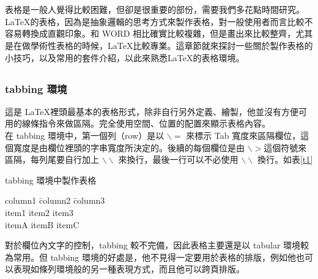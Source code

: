 

%
\chapter{}
表格是一般人覺得比較困難，但卻是很重要的部份，需要我們多花點時間研究。\LaTeX 的表格，因為是抽象邏輯的思考方式來製作表格，對一般使用者而言比較不容易轉換成直觀印象。和 WORD 相比確實比較複雜，但是畫出來比較整齊，尤其是在做學術性表格的時候，\LaTeX 比較專業。這章節就來探討一些關於製作表格的小技巧，以及常用的套件介紹，以此來熟悉\LaTeX 的表格環境。
\\
\section{}

\subsection{tabbing 環境}
這是 \LaTeX 裡頭最基本的表格形式，除非自行另外定義、繪製，他並沒有方便可用的線條指令來做區隔。完全使用空間、位置的配置來顯示表格內容。\\
在 tabbing 環境中，第一個列（row）是以 $\backslash =$ 來標示 Tab 寬度來區隔欄位，這個寬度是由欄位裡頭的字串寬度所決定的。後續的每個欄位是由 $\backslash > $這個符號來區隔，每列尾要自行加上 $\backslash \backslash$ 來換行，最後一行可以不必使用 $\backslash \backslash$ 換行。如表\ref{t1}\\

\begin{table}[h]
    \caption{tabbing 環境中製作表格}\label{t1}
    \smallskip
\begin{tabbing}
column1 \= column2 \= column3 \\
item1   \> item2   \> item3   \\
itemA   \> itemB   \> itemC
\end{tabbing}
\end{table}

對於欄位內文字的控制，tabbing 較不完備，因此表格主要還是以 tabular 環境較為常用。但 tabbing 環境的好處是，他不見得一定要用於表格的排版，例如他也可以表現如條列環境般的另一種表現方式，而且他可以跨頁排版。

